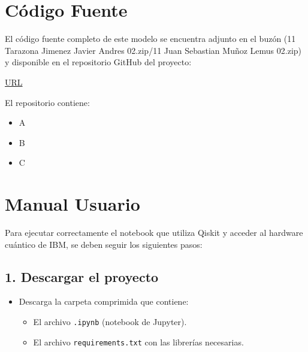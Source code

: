\documentclass{article}
\begin{document}

\section{Código Fuente}\label{sec:cod}

El código fuente completo de este modelo se encuentra adjunto en el buzón 
(11 Tarazona Jimenez Javier Andres 02.zip/11 Juan Sebastian Muñoz Lemus 02.zip)
y disponible en el repositorio GitHub del proyecto:

\begin{center}
\url{URL}
\end{center}

El repositorio contiene:
\begin{itemize}
\item A
\item B
\item C
\end{itemize}


\section{Manual Usuario}\label{sec:man_u}

Para ejecutar correctamente el notebook que utiliza Qiskit y acceder al hardware cuántico de IBM, 
se deben seguir los siguientes pasos:

\subsection*{1. Descargar el proyecto}

\begin{itemize}
    \item Descarga la carpeta comprimida que contiene:
    \begin{itemize}
        \item El archivo \texttt{.ipynb} (notebook de Jupyter).
        \item El archivo \texttt{requirements.txt} con las librerías necesarias.
    \end{itemize}
\end{itemize}
\end{document}
